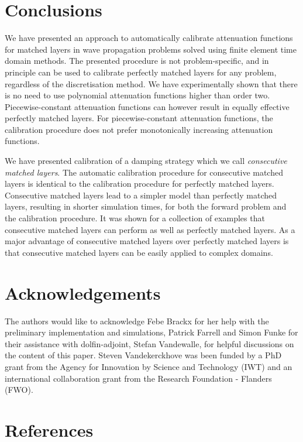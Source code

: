 \documentclass[a4paper]{article}
\begin{document}
\section{Conclusions}
\label{sec:conclusions}

We have presented an approach to automatically calibrate attenuation
functions for matched layers in wave propagation problems solved using
finite element time domain methods. The presented procedure is not
problem-specific, and in principle can be used to calibrate perfectly
matched layers for any problem, regardless of the discretisation
method. We have experimentally shown that there is no need to use
polynomial attenuation functions higher than order
two. Piecewise-constant attenuation functions can however result in
equally effective perfectly matched layers. For piecewise-constant
attenuation functions, the calibration procedure does not prefer
monotonically increasing attenuation functions.

We have presented calibration of a damping strategy which we call
\emph{consecutive matched layers}. The automatic calibration procedure
for consecutive matched layers is identical to the calibration
procedure for perfectly matched layers. Consecutive matched layers
lead to a simpler model than perfectly matched layers, resulting in
shorter simulation times, for both the forward problem and the
calibration procedure. It was shown for a collection of examples that
consecutive matched layers can perform as well as perfectly matched
layers. As a major advantage of consecutive matched layers over
perfectly matched layers is that consecutive matched layers can be
easily applied to complex domains.

\section*{Acknowledgements}

The authors would like to acknowledge Febe Brackx for her help with
the preliminary implementation and simulations, Patrick Farrell and
Simon Funke for their assistance with dolfin-adjoint, Stefan
Vandewalle, for helpful discussions on the content of this paper.
Steven Vandekerckhove was been funded by a PhD grant from the Agency
for Innovation by Science and Technology (IWT) and an international
collaboration grant from the Research Foundation - Flanders (FWO).
\section*{References}


\appendix
\end{document}
